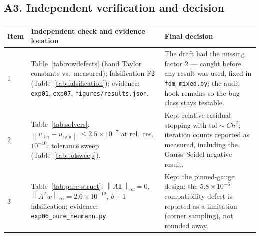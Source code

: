 \documentclass[11pt,a4paper]{article}
\newcommand{\vect}[1]{\mathbf{#1}}
\newcommand{\norm}[1]{\left\lVert #1 \right\rVert}
\begin{document}
\subsection*{A3. Independent verification and decision}
\begin{table}[h]
\centering
\small
\begin{tabular}{@{}p{0.8cm}p{5.7cm}p{5.0cm}@{}}
\toprule
Item & Independent check and evidence location & Final decision \\
\midrule
1 &
Table~\ref{tab:rowdefects} (hand Taylor constants vs.\ measured);
falsification F2 (Table~\ref{tab:falsification}); evidence:
\texttt{exp01}, \texttt{exp07}, \texttt{figures/results.json}. &
The draft had the missing factor $2$ --- caught before any result was
used, fixed in \texttt{fdm\_mixed.py}; the audit hook remains so the bug
class stays testable. \\
2 &
Table~\ref{tab:solvers}: $\norm{u_{\mathrm{iter}} - u_{\mathrm{splu}}}
\le 2.5\times10^{-7}$ at rel.\ res.\ $10^{-10}$; tolerance sweep
(Table~\ref{tab:tolsweep}). &
Kept relative-residual stopping with $\mathrm{tol} \sim Ch^2$; iteration
counts reported as measured, including the Gauss--Seidel negative result. \\
3 &
Table~\ref{tab:pure-struct}: $\norm{A\vect{1}}_\infty = 0$,
$\norm{A^T w}_\infty = 2.6\times10^{-12}$, $b+1$ falsification; evidence:
\texttt{exp06\_pure\_neumann.py}. &
Kept the pinned-gauge design; the $5.8\times10^{-6}$ compatibility defect
is reported as a limitation (corner sampling), not rounded away. \\
\bottomrule
\end{tabular}
\end{table}
\end{document}

